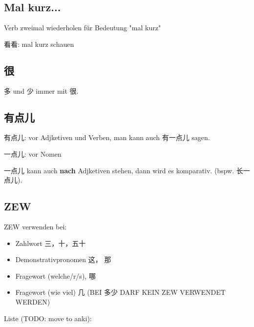 \documentclass[UTF8]{ctexart}
\begin{document}
\subsection{Mal kurz...}

Verb zweimal wiederholen für Bedeutung "mal kurz"

看看: mal kurz schauen

\subsection{很}

多 und 少 immer mit 很.

\subsection{有点儿}

有点儿: vor Adjketiven und Verben, man kann auch 有一点儿 sagen.

一点儿: vor Nomen

一点儿 kann auch \textbf{nach} Adjketiven stehen, dann wird es komparativ. (bspw. 长一点儿). 


\subsection{ZEW}

ZEW verwenden bei:

\begin{itemize}
    \item Zahlwort 三，十，五十
    \item Demonstrativpronomen 这， 那
    \item Fragewort (welche/r/s), 哪
    \item Fragewort (wie viel) 几 (BEI 多少 DARF KEIN ZEW VERWENDET WERDEN)
\end{itemize}

Liste (TODO: move to anki):
\end{document}
